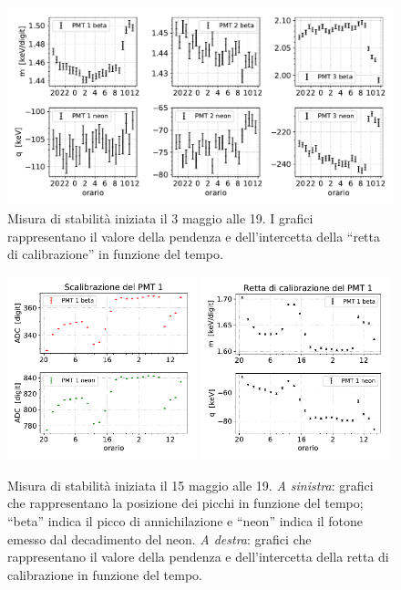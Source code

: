 \begin{figure}[h]
\centering
\includegraphics[width=\textwidth]{immagini/0503_rette}
\caption{Misura di stabilità iniziata il 3 maggio alle 19. I grafici rappresentano il valore della pendenza e dell'intercetta della ``retta di calibrazione'' in funzione del tempo.}
\label{rette1}
\end{figure}

\begin{figure}[h]
\centering
\subfloat
{
\includegraphics[width=0.49\textwidth]{immagini/0515_picchi}
}
\subfloat
{
\includegraphics[width=0.49\textwidth]{immagini/0515_rette}
}
\caption{Misura di stabilità iniziata il 15 maggio alle 19.
\emph{A sinistra}:  grafici che rappresentano la posizione dei picchi in funzione del tempo; ``beta'' indica il picco di annichilazione e ``neon'' indica il fotone emesso dal decadimento del neon.
\emph{A destra}: grafici che rappresentano il valore della pendenza e dell'intercetta della retta di calibrazione in funzione del tempo.}
\label{picchi2}
\end{figure}


